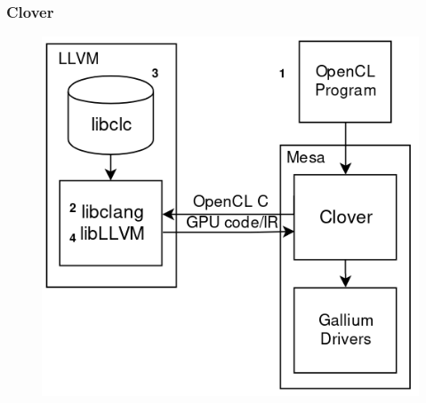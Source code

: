 \documentclass{smilebeamer}
\begin{document}
\begin{frame}
\frametitle{Clover}
\begin{figure}
\includegraphics[width=0.7\linewidth]{img/clover_numbered.png}
\end{figure}
\end{frame}

\end{document}
